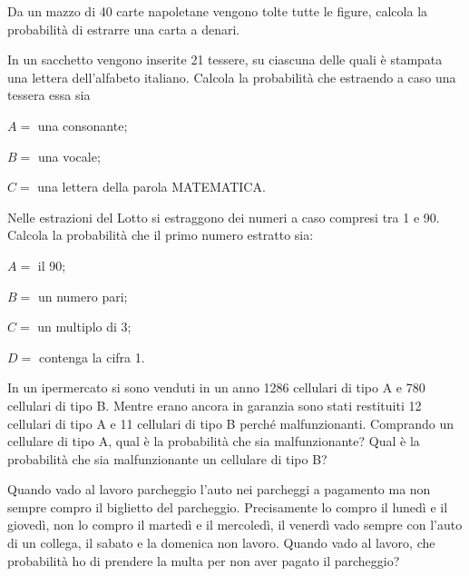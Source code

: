 \begin{esercizio}
 \label{ese:9.22}
Da un mazzo di 40 carte napoletane vengono tolte tutte le figure, calcola la probabilità di estrarre una carta a denari.
\end{esercizio}

\begin{esercizio}
 \label{ese:9.23}
In un sacchetto vengono inserite 21 tessere, su ciascuna delle quali è stampata una lettera dell'alfabeto italiano. Calcola la probabilità che estraendo a caso una tessera essa sia
\begin{itemize*}
\item $ A= $ una consonante;
\item $ B= $ una vocale;
\item $ C= $ una lettera della parola MATEMATICA.
\end{itemize*}
\end{esercizio}

\begin{esercizio}
 \label{ese:9.24}
Nelle estrazioni del Lotto si estraggono dei numeri a caso compresi tra 1 e 90. Calcola la probabilità che il primo numero estratto sia:
\begin{itemize*}
\item $ A= $ il 90;
\item $ B= $ un numero pari;
\item $ C= $ un multiplo di 3;
\item $ D= $ contenga la cifra 1.
\end{itemize*}
\end{esercizio}

\begin{esercizio}
 \label{ese:9.25}
In un ipermercato si sono venduti in un anno 1286 cellulari di tipo A e 780 cellulari di tipo B. Mentre erano ancora in garanzia sono stati restituiti 12 cellulari di tipo A e 11 cellulari di tipo B perché malfunzionanti. Comprando un cellulare di tipo A, qual è la probabilità che sia malfunzionante? Qual è la probabilità che sia malfunzionante un cellulare di tipo B?
\end{esercizio}

\begin{esercizio}
 \label{ese:9.26}
Quando vado al lavoro parcheggio l'auto nei parcheggi a pagamento ma non sempre compro il biglietto del parcheggio. Precisamente lo compro il lunedì e il giovedì, non lo compro il martedì e il mercoledì, il venerdì vado sempre con l'auto di un collega, il sabato e la domenica non lavoro. Quando vado al lavoro, che probabilità ho di prendere la multa per non aver pagato il parcheggio?
\end{esercizio}

